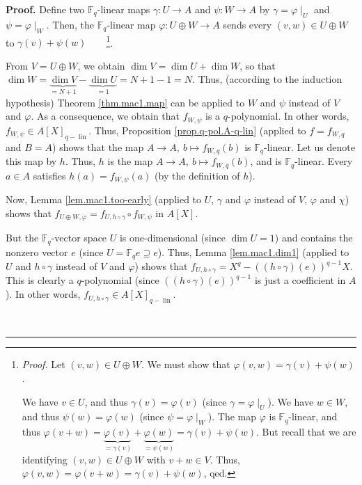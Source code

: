 \documentclass[numbers=enddot,12pt,final,onecolumn,notitlepage]{scrartcl}%
\theoremstyle{definition}
\newenvironment{proof}[1][Proof]{\noindent\textbf{#1.} }{\ \rule{0.5em}{0.5em}}
\begin{document}
\begin{proof}
Define two $\mathbb{F}_{q}$-linear maps $\gamma:U\rightarrow A$ and
$\psi:W\rightarrow A$ by $\gamma=\varphi\mid_{U}$ and $\psi=\varphi\mid_{W}$.
Then, the $\mathbb{F}_{q}$-linear map $\varphi:U\oplus W\rightarrow A$ sends
every $\left(  v,w\right)  \in U\oplus W$ to $\gamma\left(  v\right)
+\psi\left(  w\right)  $\ \ \ \ \footnote{\textit{Proof.} Let $\left(
v,w\right)  \in U\oplus W$. We must show that $\varphi\left(  v,w\right)
=\gamma\left(  v\right)  +\psi\left(  w\right)  $.
\par
We have $v\in U$, and thus $\gamma\left(  v\right)  =\varphi\left(  v\right)
$ (since $\gamma=\varphi\mid_{U}$). We have $w\in W$, and thus $\psi\left(
w\right)  =\varphi\left(  w\right)  $ (since $\psi=\varphi\mid_{W}$). The map
$\varphi$ is $\mathbb{F}_{q}$-linear, and thus $\varphi\left(  v+w\right)
=\underbrace{\varphi\left(  v\right)  }_{=\gamma\left(  v\right)
}+\underbrace{\varphi\left(  w\right)  }_{=\psi\left(  w\right)  }%
=\gamma\left(  v\right)  +\psi\left(  w\right)  $. But recall that we are
identifying $\left(  v,w\right)  \in U\oplus W$ with $v+w\in V$. Thus,
$\varphi\left(  v,w\right)  =\varphi\left(  v+w\right)  =\gamma\left(
v\right)  +\psi\left(  w\right)  $, qed.}.

From $V=U\oplus W$, we obtain $\dim V=\dim U+\dim W$, so that $\dim
W=\underbrace{\dim V}_{=N+1}-\underbrace{\dim U}_{=1}=N+1-1=N$. Thus,
(according to the induction hypothesis) Theorem \ref{thm.mac1.map} can be
applied to $W$ and $\psi$ instead of $V$ and $\varphi$. As a consequence, we
obtain that $f_{W,\psi}$ is a $q$-polynomial. In other words, $f_{W,\psi}\in
A\left[  X\right]  _{q-\operatorname*{lin}}$. Thus, Proposition
\ref{prop.q-pol.A-q-lin} (applied to $f=f_{W,q}$ and $B=A$) shows that the map
$A\rightarrow A,\ b\mapsto f_{W,q}\left(  b\right)  $ is $\mathbb{F}_{q}%
$-linear. Let us denote this map by $h$. Thus, $h$ is the map $A\rightarrow
A,\ b\mapsto f_{W,q}\left(  b\right)  $, and is $\mathbb{F}_{q}$-linear. Every
$a\in A$ satisfies $h\left(  a\right)  =f_{W,\psi}\left(  a\right)  $ (by the
definition of $h$).

Now, Lemma \ref{lem.mac1.too-early} (applied to $U$, $\gamma$ and $\varphi$
instead of $V$, $\varphi$ and $\chi$) shows that $f_{U\oplus W,\varphi
}=f_{U,h\circ\gamma}\circ f_{W,\psi}$ in $A\left[  X\right]  $.

But the $\mathbb{F}_{q}$-vector space $U$ is one-dimensional (since $\dim
U=1$) and contains the nonzero vector $e$ (since $U=\mathbb{F}_{q}e\supseteq
e$). Thus, Lemma \ref{lem.mac1.dim1} (applied to $U$ and $h\circ\gamma$
instead of $V$ and $\varphi$) shows that $f_{U,h\circ\gamma}=X^{q}-\left(
\left(  h\circ\gamma\right)  \left(  e\right)  \right)  ^{q-1}X$. This is
clearly a $q$-polynomial (since $\left(  \left(  h\circ\gamma\right)  \left(
e\right)  \right)  ^{q-1}$ is just a coefficient in $A$). In other words,
$f_{U,h\circ\gamma}\in A\left[  X\right]  _{q-\operatorname*{lin}}$.


\end{proof}
\end{document}
